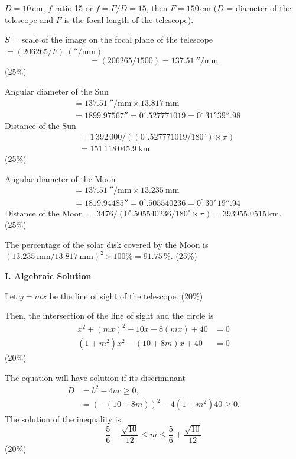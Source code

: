 $D = 10$\,cm, $f$-ratio 15 or $f = F/D = 15$, then $F = 150$\,cm
($D$ = diameter of the telescope and $F$ is the focal length of the
telescope).

$S$ = scale of the image on the focal plane of the telescope
$= (206265/F)\ (''/\mathrm{mm})$
\[
= (206265/1500) = 137.51\ ''/\mathrm{mm}
\]
\hfill(25\%)

Angular diameter of the Sun
\begin{align*}
&= 137.51\ ''/\mathrm{mm} \times 13.817\ \mathrm{mm}\\
&= 1899.97567'' = 0^\circ.527771019 = 0^\circ\,31'\,39''.98
\end{align*}
Distance of the Sun
\begin{align*}
&= 1\,392\,000/\left((0^\circ.527771019/180^\circ)\times\pi\right)\\
&= 151\,118\,045.9\ \mathrm{km}
\end{align*}
\hfill(25\%)

Angular diameter of the Moon
\begin{align*}
&= 137.51\ ''/\mathrm{mm} \times 13.235\ \mathrm{mm}\\
&= 1819.94485'' = 0^\circ.505540236 = 0^\circ\,30'\,19''.94
\end{align*}
Distance of the Moon
$= 3476/(0^\circ.505540236/180^\circ \times \pi) = 393955.0515$\,km.
\hfill(25\%)

The percentage of the solar disk covered by the Moon is
$(13.235\ \mathrm{mm}/13.817\ \mathrm{mm})^2 \times 100\% = 91.75\,\%$.
\hfill(25\%)

\textbf{I. Algebraic Solution}

Let $y = mx$ be the line of sight of the telescope. \hfill(20\%)

Then, the intersection of the line of sight and the circle is
\begin{align*}
x^2 + (mx)^2 - 10x - 8(mx) + 40 &= 0\\
\left(1+m^2\right)x^2 - (10+8m)x + 40 &= 0
\end{align*}
\hfill(20\%)

The equation will have solution if its discriminant
\begin{align*}
D &= b^2 - 4ac \ge 0,\\
  &= (-(10+8m))^2 - 4(1+m^2)40 \ge 0.
\end{align*}
The solution of the inequality is
\[
\frac{5}{6} - \frac{\sqrt{10}}{12} \le m \le
\frac{5}{6} + \frac{\sqrt{10}}{12}
\]
\hfill(20\%)


